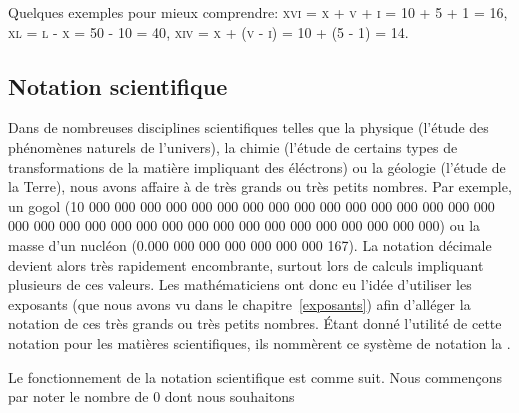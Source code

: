 Quelques exemples pour mieux comprendre: \textsc{xvi = x + v + i = 10 + 5 + 1 = 16}, \textsc{xl = l - x = 50 - 10 = 40}, \textsc{xiv = x + (v - i) = 10 + (5 - 1) = 14}.

\subsection{Notation scientifique}

Dans de nombreuses disciplines scientifiques telles que la physique (l'étude des phénomènes naturels de l'univers), la chimie (l'étude de certains types de transformations de la matière impliquant des éléctrons) ou la géologie (l'étude de la Terre), nous avons affaire à de très grands ou très petits nombres. Par exemple, un gogol (10 000 000 000 000 000 000 000 000 000 000 000 000 000 000 000 000 000 000 000 000 000 000 000 000 000 000 000 000 000 000 000 000 000) ou la masse d'un nucléon (0.000 000 000 000 000 000 000 167). La notation décimale devient alors très rapidement encombrante, surtout lors de calculs impliquant plusieurs de ces valeurs. Les mathématiciens ont donc eu l'idée d'utiliser les exposants (que nous avons vu dans le chapitre~\ref{exposants}) afin d'alléger la notation de ces très grands ou très petits nombres. Étant donné l'utilité de cette notation pour les matières scientifiques, ils nommèrent ce système de notation la .

Le fonctionnement de la notation scientifique est comme suit. Nous commençons par noter le nombre de 0 dont nous souhaitons

